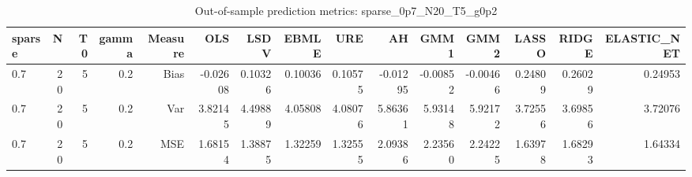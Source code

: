 \begin{table}[!htbp]\centering
\caption{Out-of-sample prediction metrics: sparse_0p7_N20_T5_g0p2}
\label{tab:table3_sparse_0p7_N20_T5_g0p2}
\begin{tabular}{lrrrrrrrrrrrrrr}
\hline
sparse & N & T0 & gamma & Measure & OLS & LSDV & EBMLE & URE & AH & GMM1 & GMM2 & LASSO & RIDGE & ELASTIC_NET \\
\hline
0.7 & 20 & 5 & 0.2 & Bias & -0.02608 & 0.10326 & 0.10036 & 0.10575 & -0.01295 & -0.00852 & -0.00466 & 0.24809 & 0.26029 & 0.24953 \\
0.7 & 20 & 5 & 0.2 & Var & 3.82145 & 4.49889 & 4.05808 & 4.08076 & 5.86361 & 5.93148 & 5.92172 & 3.72556 & 3.69856 & 3.72076 \\
0.7 & 20 & 5 & 0.2 & MSE & 1.68154 & 1.38875 & 1.32259 & 1.32555 & 2.09386 & 2.23560 & 2.24225 & 1.63978 & 1.68293 & 1.64334 \\
\hline
\end{tabular}
\end{table}

